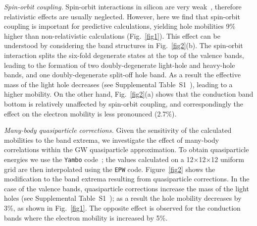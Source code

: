 \documentclass[aps,prl,twocolumn,superscriptaddress]{revtex4-1}
\begin{document}
{\it Spin-orbit coupling.}
Spin-orbit interactions in silicon are very weak~\cite{Yu2010}, therefore relativistic 
effects are usually neglected. However, here we find that
spin-orbit coupling is important for predictive calculations, yielding hole mobilities 9\% higher 
than non-relativistic calculations (Fig.~\ref{fig1}). This effect can be understood by considering 
the band structures in Fig.~\ref{fig2}(b). The spin-orbit interaction splits the six-fold 
degenerate states at the top of the valence bands, leading to the formation of two doubly-degenerate 
light-hole and heavy-hole bands, and one doubly-degenerate split-off hole band. As a result the effective 
mass of the light hole decreases (see Supplemental Table~S1~\cite{SI}), leading to a higher
mobility. On the other hand, Fig.~\ref{fig2}(a) shows that the conduction band bottom is 
relatively unaffected by spin-orbit coupling, and correspondingly the effect on the electron mobility is less pronounced 
(2.7\%).

{\it Many-body quasiparticle corrections.}
Given the sensitivity of the calculated mobilities to the band extrema, we investigate the effect of
many-body correlations within the GW quasiparticle approximation. To obtain quasiparticle energies 
we use the \texttt{Yambo} code~\cite{Marini2009}; the values calculated
on a 12$\times$12$\times$12 uniform grid are then interpolated using the \texttt{EPW} code. Figure~\ref{fig2} shows the 
modification to the band extrema resulting from quasiparticle corrections. In the case of the valence
bands, quasiparticle corrections increase the mass of the light holes (see Supplemental Table~S1~\cite{SI}); as a result the hole mobility decreases by 3\%, as shown in Fig.~\ref{fig1}. The opposite effect is observed for the
conduction bands where the electron mobility is increased by 5\%.
\end{document}
